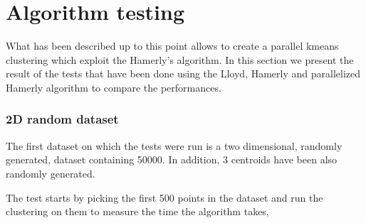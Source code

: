 \documentclass{report}
\begin{document}
{\begin{minipage}[b]{0.48\textwidth}
      \section*{Algorithm testing}
      What has been described up to this point allows to create a parallel kmeans clustering which exploit the Hamerly's algorithm. In this section we present the result of the tests that have been done using the Lloyd, Hamerly and parallelized Hamerly algorithm to compare the performances.

      \subsubsection*{2D random dataset}
      The first dataset on which the tests were run is a two dimensional, randomly generated, dataset containing 50000. In addition, 3 centroids have been also randomly generated. 

      The test starts by picking the first 500 points in the dataset and run the clustering on them to measure the time the algorithm takes,
\end{minipage}}

\newpage
\end{document}
